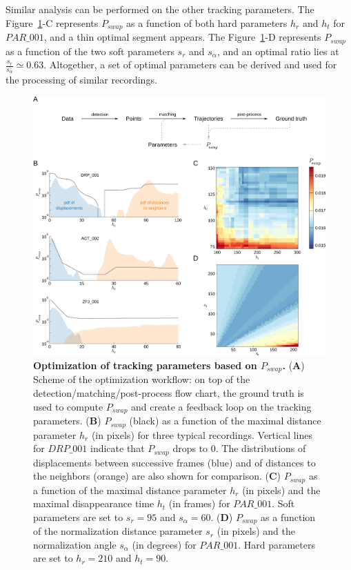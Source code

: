     Similar analysis can be performed on the other tracking parameters. The Figure~\ref{part_1:fig_4}-C represents $P_{swap}$ as a function of both hard parameters $h_r$ and $h_t$ for $PAR\_001$, and a thin optimal segment appears. The Figure~\ref{part_1:fig_4}-D represents $P_{swap}$ as a function of the two soft parameters $s_r$ and $s_\alpha$, and an optimal ratio lies at $\frac{s_r}{s_\alpha} \simeq 0.63$. Altogether, a set of optimal parameters can be derived and used for the processing of similar recordings.

    \begin{figure}[h!]
    \centering
    \includegraphics[width=1\textwidth]{part_1/assets/Figure_4.png}
    \caption{{\bf Optimization of tracking parameters based on $P_{swap}$.}
        (\textbf{A}) Scheme of the optimization workflow: on top of the detection/matching/post-process flow chart, the ground truth is used to compute $P_{swap}$ and create a feedback loop on the tracking parameters.
        (\textbf{B}) $P_{swap}$ (black) as a function of the maximal distance parameter $h_r$ (in pixels) for three typical recordings. Vertical lines for $DRP\_001$ indicate  that $P_{swap}$ drops to 0. The distributions of displacements between successive frames (blue) and of distances to the neighbors (orange) are also shown for comparison.
        (\textbf{C}) $P_{swap}$ as a function of the maximal distance parameter $h_r$ (in pixels) and the maximal disappearance time $h_t$ (in frames) for $PAR\_001$. Soft parameters are set to $s_r = 95$ and $s_\alpha = 60$.
        (\textbf{D}) $P_{swap}$ as a function of the normalization distance parameter $s_r$ (in pixels) and the normalization angle $s_\alpha$ (in degrees) for $PAR\_001$. Hard parameters are set to $h_r = 210$ and $h_t = 90$.}
    \label{part_1:fig_4}
    \end{figure}


